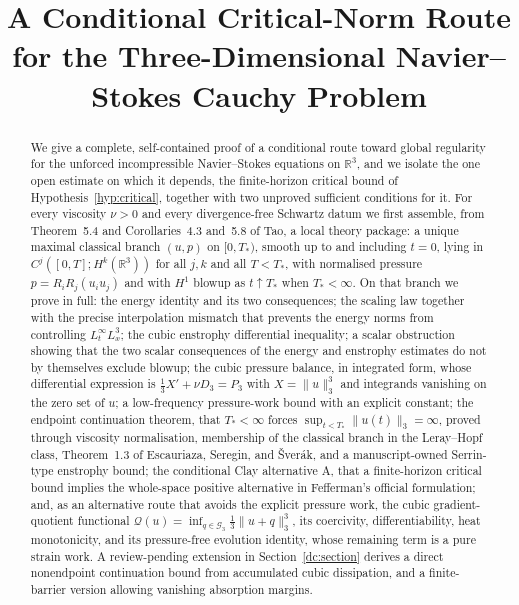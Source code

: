 \documentclass[11pt]{article}
\title{A Conditional Critical-Norm Route for the Three-Dimensional
Navier--Stokes Cauchy Problem}
\author{}
\date{}
\theoremstyle{definition}
\theoremstyle{plain}
\newcommand{\R}{\mathbb R}
\newcommand{\norm}[1]{\lVert #1\rVert}
\begin{document}
\maketitle

\begin{abstract}
We give a complete, self-contained proof of a conditional route toward
global regularity for the unforced incompressible Navier--Stokes equations
on $\R^3$, and we
isolate the one open estimate on which it depends, the finite-horizon
critical bound of Hypothesis~\ref{hyp:critical}, together with two
unproved sufficient conditions for it.
For every viscosity $\nu>0$ and every divergence-free Schwartz datum we
first assemble, from Theorem~5.4 and Corollaries~4.3 and~5.8 of Tao, a
local theory package: a unique maximal classical branch $(u,p)$ on
$[0,T_*)$, smooth up to and including $t=0$, lying in
$C^j([0,T];H^k(\R^3))$ for all $j,k$ and all $T<T_*$, with normalised
pressure $p=R_iR_j(u_iu_j)$ and with $H^1$ blowup as $t\uparrow T_*$ when
$T_*<\infty$.  On that branch we prove in full: the energy identity and its
two consequences; the scaling law together with the precise interpolation
mismatch that prevents the energy norms from controlling
$L^\infty_tL^3_x$; the cubic enstrophy differential inequality; a scalar
obstruction showing that the two scalar consequences of the energy and
enstrophy estimates do not by themselves exclude blowup; the cubic
pressure balance, in integrated form, whose differential expression is
$\frac13X'+\nu D_3=P_3$ with
$X=\norm u_3^3$ and integrands vanishing on the zero set of $u$; a
low-frequency pressure-work bound with an explicit constant; the endpoint
continuation theorem, that $T_*<\infty$ forces
$\sup_{t<T_*}\norm{u(t)}_3=\infty$, proved through viscosity
normalisation, membership of the classical branch in the Leray--Hopf class,
Theorem~1.3 of Escauriaza, Seregin, and \v Sver\'ak, and a manuscript-owned
Serrin-type enstrophy bound; the conditional Clay alternative A, that a
finite-horizon critical bound implies the whole-space positive alternative
in Fefferman's official formulation; and, as an alternative route that
avoids the explicit pressure work, the cubic gradient-quotient functional
$\mathcal Q(u)=\inf_{q\in\mathcal G_3}\frac13\norm{u+q}_3^3$, its
coercivity, differentiability, heat monotonicity, and its pressure-free
evolution identity, whose remaining term is a pure strain work.
A review-pending extension in Section~\ref{dc:section} derives a direct nonendpoint continuation bound from accumulated cubic dissipation, and a finite-barrier version allowing vanishing absorption margins.

\end{abstract}
\end{document}
